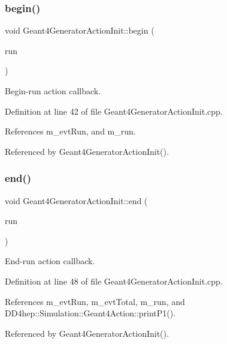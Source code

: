 \subsubsection{\texorpdfstring{begin()}{begin()}}
{\footnotesize\ttfamily void Geant4\+Generator\+Action\+Init\+::begin (\begin{DoxyParamCaption}\item[{const G4\+Run $\ast$}]{run }\end{DoxyParamCaption})}



Begin-\/run action callback. 



Definition at line 42 of file Geant4\+Generator\+Action\+Init.\+cpp.



References m\+\_\+evt\+Run, and m\+\_\+run.



Referenced by Geant4\+Generator\+Action\+Init().

\hypertarget{class_d_d4hep_1_1_simulation_1_1_geant4_generator_action_init_aa3b0b224ed839f32af03507be13267a8}{}\label{class_d_d4hep_1_1_simulation_1_1_geant4_generator_action_init_aa3b0b224ed839f32af03507be13267a8} 
\subsubsection{\texorpdfstring{end()}{end()}}
{\footnotesize\ttfamily void Geant4\+Generator\+Action\+Init\+::end (\begin{DoxyParamCaption}\item[{const G4\+Run $\ast$}]{run }\end{DoxyParamCaption})}



End-\/run action callback. 



Definition at line 48 of file Geant4\+Generator\+Action\+Init.\+cpp.



References m\+\_\+evt\+Run, m\+\_\+evt\+Total, m\+\_\+run, and D\+D4hep\+::\+Simulation\+::\+Geant4\+Action\+::print\+P1().



Referenced by Geant4\+Generator\+Action\+Init().

